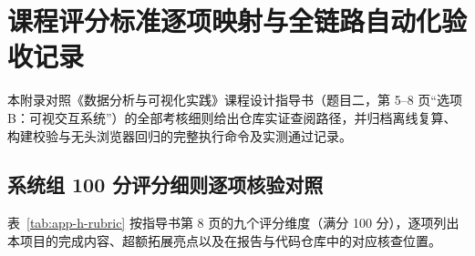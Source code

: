 \chapter{课程评分标准逐项映射与全链路自动化验收记录}\label{app:validation}

本附录对照《数据分析与可视化实践》课程设计指导书（题目二，第 5--8 页“选项 B：可视交互系统”）的全部考核细则给出仓库实证查阅路径，并归档离线复算、构建校验与无头浏览器回归的完整执行命令及实测通过记录。

\section{系统组 100 分评分细则逐项核验对照}

表~\ref{tab:app-h-rubric} 按指导书第 8 页的九个评分维度（满分 100 分），逐项列出本项目的完成内容、超额拓展亮点以及在报告与代码仓库中的对应核查位置。

